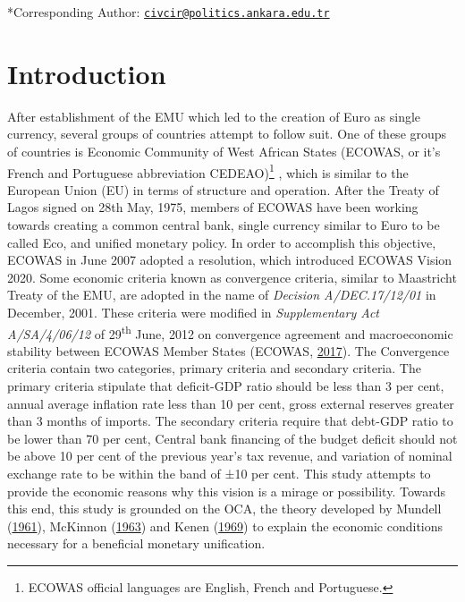 \documentclass[]{article}
\let\rmarkdownfootnote\footnote%
\def\footnote{\protect\rmarkdownfootnote}
\begin{document}
\vskip60pt

\hrulefill

*Corresponding Author: \href{mailto:civcir@politics.ankara.edu.tr}{\nolinkurl{civcir@politics.ankara.edu.tr}}
\clearpage
\pagestyle{plain}

\hypertarget{introduction}{%
\section{Introduction}\label{introduction}}

After establishment of the  \ac{EMU} which led to the creation of Euro as single currency, several groups of countries attempt to follow suit. One of these groups of countries is Economic Community of West African States (ECOWAS, or it's French and Portuguese abbreviation CEDEAO)\footnote{ECOWAS official languages are English, French and Portuguese.} , which is similar to the European Union (EU) in terms of structure and operation. After the Treaty of Lagos signed on 28th May, 1975, members of ECOWAS have been working towards creating a common central bank, single currency similar to Euro to be called Eco, and unified monetary policy. In order to accomplish this objective, ECOWAS in June 2007 adopted a resolution, which introduced ECOWAS Vision 2020. Some economic criteria known as convergence criteria, similar to Maastricht Treaty of the EMU, are adopted in the name of \emph{Decision A/DEC.17/12/01} in December, 2001. These criteria were modified in \emph{Supplementary Act A/SA/4/06/12} of 29\textsuperscript{th} June, 2012 on convergence agreement and macroeconomic stability between ECOWAS Member States (ECOWAS, \protect\hyperlink{ref-ECOWAS2017}{2017}). The Convergence criteria contain two categories, primary criteria and secondary criteria. The primary criteria stipulate that deficit-GDP ratio should be less than 3 per cent, annual average inflation rate less than 10 per cent, gross external reserves greater than 3 months of imports. The secondary criteria require that debt-GDP ratio to be lower than 70 per cent, Central bank financing of the budget deficit should not be above 10 per cent of the previous year's tax revenue, and variation of nominal exchange rate to be within the band of ±10 per cent. This study attempts to provide the economic reasons why this vision is a mirage or possibility. Towards this end, this study is grounded on the  \ac{OCA}, the theory developed by Mundell (\protect\hyperlink{ref-mundell1961theory}{1961}), McKinnon (\protect\hyperlink{ref-McKinnon1963}{1963}) and Kenen (\protect\hyperlink{ref-kenen1969theory}{1969}) to explain the economic conditions necessary for a beneficial monetary unification.
\end{document}
